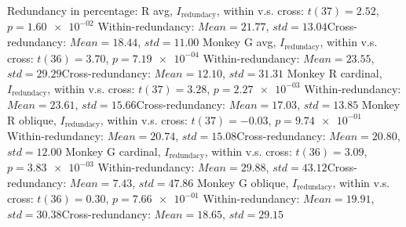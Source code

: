 Redundancy in percentage: \nMonkey R avg, $I_\textrm{redundacy}$, within v.s. cross: $t(37) = 2.52$, $p = \num{1.60e-02}$ 
Within-redundancy: $Mean = 21.77$, $std = 13.04$Cross-redundancy: $Mean = 18.44$, $std = 11.00$ 
Monkey G avg, $I_\textrm{redundacy}$, within v.s. cross: $t(36) = 3.70$, $p = \num{7.19e-04}$ 
Within-redundancy: $Mean = 23.55$, $std = 29.29$Cross-redundancy: $Mean = 12.10$, $std = 31.31$ 
Monkey R cardinal, $I_\textrm{redundacy}$, within v.s. cross: $t(37) = 3.28$, $p = \num{2.27e-03}$ 
Within-redundancy: $Mean = 23.61$, $std = 15.66$Cross-redundancy: $Mean = 17.03$, $std = 13.85$ 
Monkey R oblique, $I_\textrm{redundacy}$, within v.s. cross: $t(37) = -0.03$, $p = \num{9.74e-01}$ 
Within-redundancy: $Mean = 20.74$, $std = 15.08$Cross-redundancy: $Mean = 20.80$, $std = 12.00$ 
Monkey G cardinal, $I_\textrm{redundacy}$, within v.s. cross: $t(36) = 3.09$, $p = \num{3.83e-03}$ 
Within-redundancy: $Mean = 29.88$, $std = 43.12$Cross-redundancy: $Mean = 7.43$, $std = 47.86$ 
Monkey G oblique, $I_\textrm{redundacy}$, within v.s. cross: $t(36) = 0.30$, $p = \num{7.66e-01}$ 
Within-redundancy: $Mean = 19.91$, $std = 30.38$Cross-redundancy: $Mean = 18.65$, $std = 29.15$ 
